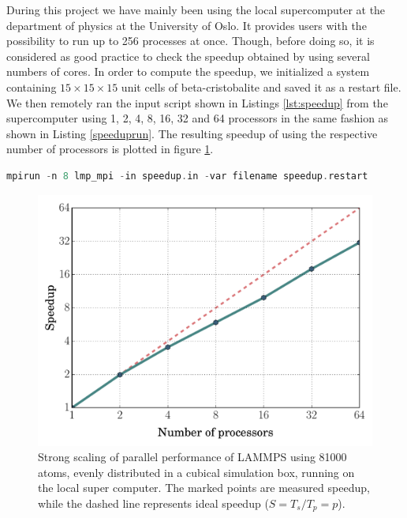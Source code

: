 \documentclass[twoside,english]{uiofysmaster}
\begin{document}
During this project we have mainly been using the local supercomputer at the department of physics at the University of Oslo. It provides users with the possibility to run  up to 256 processes at once. Though, before doing so, it is considered as good practice to check the speedup obtained by using several numbers of cores.
In order to compute the speedup, we initialized a system containing $15\times15\times15$ unit cells of beta-cristobalite and saved it as a restart file. 
We then remotely ran the input script shown in Listings \ref{lst:speedup} from the supercomputer using 1, 2, 4, 8, 16, 32 and 64 processors in the same fashion as shown in Listing \ref{speeduprun}.  
The resulting speedup of using the respective number of processors is plotted in figure \ref{fig:speedup15x15}.



\begin{lstlisting}[caption={Command used to excecute the input script speedup.in on 8 parallel processors and set the filename variable to speedup.restart.}, label={speeduprun}, language=c++]
mpirun -n 8 lmp_mpi -in speedup.in -var filename speedup.restart
\end{lstlisting}
\begin{figure}[H]
	\centering
	\includegraphics[width=0.7\linewidth]{figures/speedup/15x15_bigFonts.pdf}
	\caption{Strong scaling of parallel performance of LAMMPS using 81000 atoms, evenly distributed in a cubical simulation box, running on the local super computer. The marked points are measured speedup, while the dashed line represents ideal speedup ($S = T_s/T_p = p$). }
	\label{fig:speedup15x15}
\end{figure}
\end{document}
